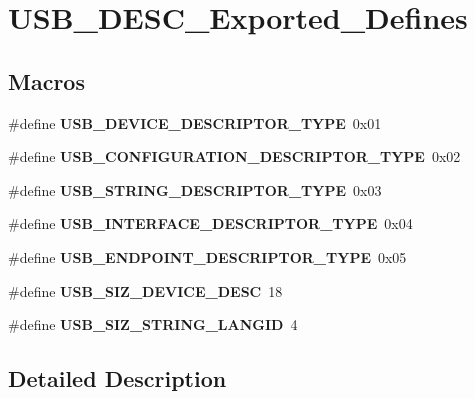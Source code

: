 \hypertarget{group__USB__DESC__Exported__Defines}{\section{U\-S\-B\-\_\-\-D\-E\-S\-C\-\_\-\-Exported\-\_\-\-Defines}
\label{group__USB__DESC__Exported__Defines}
}
\subsection*{Macros}
\begin{DoxyCompactItemize}
\item 
\hypertarget{group__USB__DESC__Exported__Defines_ga722f2d6ee2892228b6708e8b9904c645}{\#define {\bfseries U\-S\-B\-\_\-\-D\-E\-V\-I\-C\-E\-\_\-\-D\-E\-S\-C\-R\-I\-P\-T\-O\-R\-\_\-\-T\-Y\-P\-E}~0x01}\label{group__USB__DESC__Exported__Defines_ga722f2d6ee2892228b6708e8b9904c645}

\item 
\hypertarget{group__USB__DESC__Exported__Defines_ga45e81401e4b530280fdd539da1b06c26}{\#define {\bfseries U\-S\-B\-\_\-\-C\-O\-N\-F\-I\-G\-U\-R\-A\-T\-I\-O\-N\-\_\-\-D\-E\-S\-C\-R\-I\-P\-T\-O\-R\-\_\-\-T\-Y\-P\-E}~0x02}\label{group__USB__DESC__Exported__Defines_ga45e81401e4b530280fdd539da1b06c26}

\item 
\hypertarget{group__USB__DESC__Exported__Defines_gab01c9c74f2eb266b20aecd48bab4b35c}{\#define {\bfseries U\-S\-B\-\_\-\-S\-T\-R\-I\-N\-G\-\_\-\-D\-E\-S\-C\-R\-I\-P\-T\-O\-R\-\_\-\-T\-Y\-P\-E}~0x03}\label{group__USB__DESC__Exported__Defines_gab01c9c74f2eb266b20aecd48bab4b35c}

\item 
\hypertarget{group__USB__DESC__Exported__Defines_gad1699884fa580bba35246a566264c978}{\#define {\bfseries U\-S\-B\-\_\-\-I\-N\-T\-E\-R\-F\-A\-C\-E\-\_\-\-D\-E\-S\-C\-R\-I\-P\-T\-O\-R\-\_\-\-T\-Y\-P\-E}~0x04}\label{group__USB__DESC__Exported__Defines_gad1699884fa580bba35246a566264c978}

\item 
\hypertarget{group__USB__DESC__Exported__Defines_ga4e8d6d81a224f8b511edc92b6cb4e085}{\#define {\bfseries U\-S\-B\-\_\-\-E\-N\-D\-P\-O\-I\-N\-T\-\_\-\-D\-E\-S\-C\-R\-I\-P\-T\-O\-R\-\_\-\-T\-Y\-P\-E}~0x05}\label{group__USB__DESC__Exported__Defines_ga4e8d6d81a224f8b511edc92b6cb4e085}

\item 
\hypertarget{group__USB__DESC__Exported__Defines_ga5e107a087e7d60a444111d2fc9381d69}{\#define {\bfseries U\-S\-B\-\_\-\-S\-I\-Z\-\_\-\-D\-E\-V\-I\-C\-E\-\_\-\-D\-E\-S\-C}~18}\label{group__USB__DESC__Exported__Defines_ga5e107a087e7d60a444111d2fc9381d69}

\item 
\hypertarget{group__USB__DESC__Exported__Defines_ga99793b3e9c554349fd487be82c38be2a}{\#define {\bfseries U\-S\-B\-\_\-\-S\-I\-Z\-\_\-\-S\-T\-R\-I\-N\-G\-\_\-\-L\-A\-N\-G\-I\-D}~4}\label{group__USB__DESC__Exported__Defines_ga99793b3e9c554349fd487be82c38be2a}

\end{DoxyCompactItemize}


\subsection{Detailed Description}

